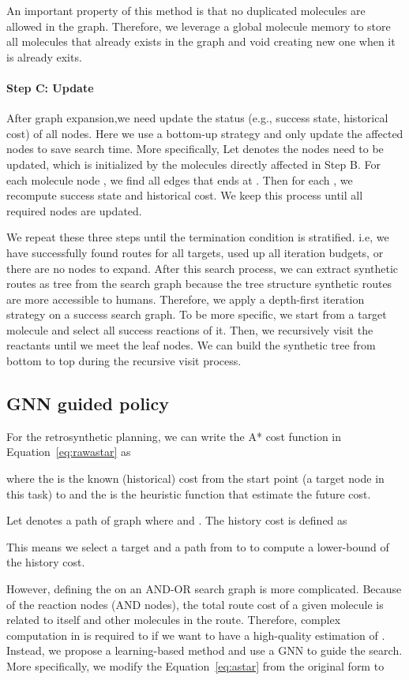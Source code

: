 \documentclass[sigconf]{acmart}
\begin{document}
An important property of this method is that no duplicated molecules are allowed in the graph.
Therefore, we leverage a global molecule memory to store all molecules that already exists in the graph and void creating new one when it is already exits.

\paragraph{Step C: Update}
After graph expansion,we need update the status (e.g., success state, historical cost) of all nodes.
Here we use a bottom-up strategy and only update the affected nodes to save search time.
More specifically, Let  denotes the nodes need to be updated, which is initialized by the molecules directly affected in Step B.
For each molecule node , we find all edges  that ends at .
Then for each , we recompute success state and historical cost.
We keep this process until all required nodes are updated.

We repeat these three steps until the termination condition is stratified.
i.e, we have successfully found routes for all targets, used up all iteration budgets, or there are no nodes to expand.
After this search process, we can extract synthetic routes as tree from the search graph because the tree structure synthetic routes are more accessible to humans.
Therefore, we apply a depth-first iteration strategy on a success search graph.
To be more specific, we start from a target molecule and select all success reactions of it. Then, we recursively visit the reactants until we meet the leaf nodes.
We can build the synthetic tree from bottom to top during the recursive visit process.


\subsection{GNN guided policy}\label{sec:gnn}
For the retrosynthetic planning, we can write the A* cost function in Equation~\eqref{eq:rawastar} as

where the  is the known (historical) cost from the start point (a target node  in this task) to  and the  is the heuristic function that estimate the future cost.

Let  denotes a path of graph  where  and .
The history cost is defined as 

This means we select a target  and a path  from  to  to compute a lower-bound of the history cost.

However, defining the  on an AND-OR search graph is more complicated.
Because of the reaction nodes (AND nodes), the total route cost of a given molecule is related to itself and other molecules in the route.
Therefore, complex computation in  is required to if we want to have a high-quality estimation of .
Instead, we propose a learning-based method and use a GNN to guide the search.
More specifically, we modify the Equation~\eqref{eq:astar} from the original form to 
\end{document}
